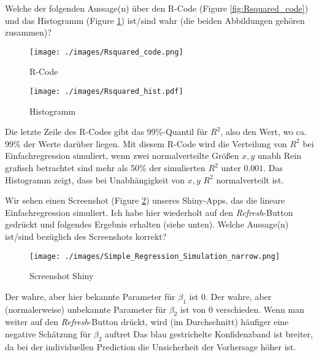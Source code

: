 \documentclass[10pt,addpoints]{exam}
\begin{document}
\begin{questions}
\question Welche der folgenden Aussage(n) über den R-Code (Figure \ref{fig:Rsquared_code}) und das Histogramm (Figure \ref{fig:Rsquared_hist}) ist/sind wahr (die beiden Abbildungen gehören zusammen)?\\

\begin{figure}[h!]
    \begin{minipage}{0.45\textwidth}
        \centering
        \texttt{[image: ./images/Rsquared\_code.png]}
        \caption{R-Code}
        \label{fig:Rsquared_code}
    \end{minipage}%
    \hfill
    \begin{minipage}{0.45\textwidth}
        \centering
        \texttt{[image: ./images/Rsquared\_hist.pdf]}
         \caption{Histogramm}
        \label{fig:Rsquared_hist}
    \end{minipage}
\end{figure}

\begin{choices}
\choice Die letzte Zeile des R-Codes gibt das 99\%-Quantil für $R^2$, also den Wert, wo ca. 99\% der Werte darüber liegen.
\CorrectChoice Mit diesem R-Code wird die Verteilung von $R^2$ bei Einfachregression simuliert, wenn zwei normalverteilte Größen $x,y$ unabh
\CorrectChoice Rein grafisch betrachtet sind mehr als 50\% der simulierten $R^2$ unter $0.001$. 
\choice Das Histogramm zeigt, dass bei Unabhängigkeit von $x,y$ $R^2$ normalverteilt ist.
\end{choices}

\question Wir sehen einen Screenshot (Figure \ref{fig:Simple_Regression_Simulation_narrow}) unseres Shiny-Apps, das die lineare Einfachregression simuliert. Ich habe hier wiederholt auf den \textit{Refresh}-Button gedrückt und folgendes Ergebnis erhalten (siehe unten). Welche Aussage(n) ist/sind bezüglich des Screenshots korrekt?

\begin{figure}[H]
\centering
\texttt{[image: ./images/Simple\_Regression\_Simulation\_narrow.png]}
\caption{Screenshot Shiny}
\label{fig:Simple_Regression_Simulation_narrow}
\end{figure}

\begin{choices}
\CorrectChoice Der wahre, aber hier bekannte Parameter für $\beta_1$ ist $0$.
\choice Der wahre, aber (normalerweise) unbekannte Parameter für $\beta_2$ ist von $0$ verschieden. 
\choice Wenn man weiter auf den \textit{Refresh}-Button drückt, wird (im Durchschnitt) häufiger eine negative Schätzung für $\beta_2$ auftret
\CorrectChoice Das blau gestrichelte Konfidenzband ist breiter, da bei der individuellen Prediction die Unsicherheit der Vorhersage höher ist. 
\end{choices}


\end{questions}
\end{document}
